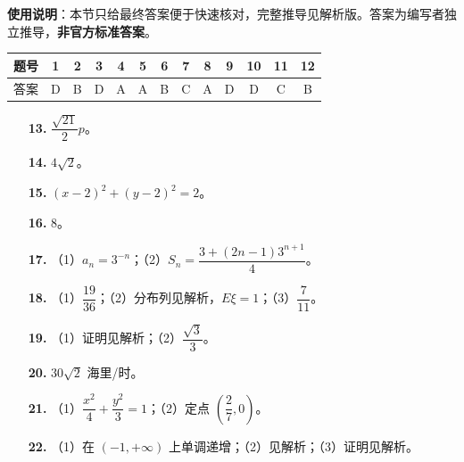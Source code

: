 
\begin{gknotice}
\textbf{使用说明}：本节只给最终答案便于快速核对，完整推导见解析版。答案为编写者独立推导，\textbf{非官方标准答案}。
\end{gknotice}

\begin{center}\begin{tabular}{ccccccccccccc}
\toprule
题号 & 1 & 2 & 3 & 4 & 5 & 6 & 7 & 8 & 9 & 10 & 11 & 12 \\
\midrule
答案 & D & B & D & A & A & B & C & A & D & D & C & B \\
\bottomrule
\end{tabular}\end{center}

\begin{itemize}[leftmargin=2.6em]
  \item[\textbf{13.}] $\dfrac{\sqrt{21}}{2}p$。
  \item[\textbf{14.}] $4\sqrt2$。
  \item[\textbf{15.}] $(x-2)^2+(y-2)^2=2$。
  \item[\textbf{16.}] $8$。
\end{itemize}

\begin{itemize}[leftmargin=2.6em]
  \item[\textbf{17.}] （1）$a_n=3^{-n}$；（2）$S_n=\dfrac{3+(2n-1)3^{n+1}}{4}$。
  \item[\textbf{18.}] （1）$\dfrac{19}{36}$；（2）分布列见解析，$E\xi=1$；（3）$\dfrac{7}{11}$。
  \item[\textbf{19.}] （1）证明见解析；（2）$\dfrac{\sqrt3}{3}$。
  \item[\textbf{20.}] $30\sqrt2$ 海里/时。
  \item[\textbf{21.}] （1）$\dfrac{x^2}{4}+\dfrac{y^2}{3}=1$；（2）定点 $\left(\dfrac27,0\right)$。
  \item[\textbf{22.}] （1）在 $(-1,+\infty)$ 上单调递增；（2）见解析；（3）证明见解析。
\end{itemize}
